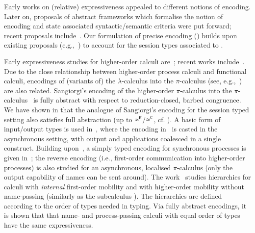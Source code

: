\documentclass[runningheads]{llncs}
\begin{document}
{Early works on (relative) expressiveness appealed to different notions of encoding.
Later on, 
proposals of abstract 
frameworks which formalise the notion of encoding 
and state associated syntactic/semantic criteria 
were put forward; 
recent proposals include~\cite{DBLP:journals/iandc/Gorla10,DBLP:journals/tcs/FuL10,DBLP:journals/corr/abs-1208-2750,DBLP:conf/esop/PetersNG13,DBLP:journals/corr/PetersG15}. 
Our formulation of precise encoding () 
builds upon existing proposals (e.g.,~\cite{Palamidessi03,DBLP:journals/iandc/Gorla10,DBLP:conf/icalp/LanesePSS10})
 to account for the session types
associated to \HOp. %


Early expressiveness studies for higher-order calculi are~\cite{Tho90,SangiorgiD:expmpa}; 
recent works include~\cite{BundgaardHG06,DBLP:conf/icalp/LanesePSS10,DBLP:journals/iandc/LanesePSS11,XuActa2012,DBLP:conf/wsfm/XuYL13}.
Due to the close relationship between higher-order process calculi and functional calculi, 
encodings of (variants of) the $\lambda$-calculus into the $\pi$-calculus (see, e.g.,~\cite{San92,DBLP:journals/tcs/Fu99,DBLP:journals/iandc/YoshidaBH04,BHY,DBLP:conf/concur/SangiorgiX14}) are also related.
Sangiorgi's encoding of the higher-order $\pi$-calculus
into the  $\pi$-calculus~\cite{SangiorgiD:expmpa} 
is fully abstract with respect to reduction-closed, barbed congruence. 
We have shown in  that the analogue of Sangiorgi's encoding for the session typed setting also satisfies full abstraction (up to $\approx^\mathtt{H}$/$\approx^\mathtt{C}$, cf. ).
A basic form of input/output types is used in~\cite{DBLP:journals/tcs/Sangiorgi01}, where the encoding in~\cite{SangiorgiD:expmpa} is casted in the asynchronous setting, with output and applications coalesced in a single construct. Building upon~\cite{DBLP:journals/tcs/Sangiorgi01}, 
a simply typed encoding for synchronous processes is given in~\cite{SaWabook}; the reverse encoding (i.e.,  first-order communication into higher-order processes) is also studied  for an asynchronous, localised $\pi$-calculus (only the output capability of names can be sent around).
The work~\cite{San96int} studies hierarchies for calculi with \emph{internal} first-order mobility and 
with higher-order mobility without name-passing (similarly as the subcalculus \HO). 
The hierarchies are
defined according to the order of types needed in typing.
Via fully abstract encodings, it is shown that that name- and process-passing calculi with equal order of types have the same expressiveness.

}
\end{document}
